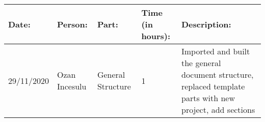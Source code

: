 \begin{table}[h]
    \begin{tabular}{|p{2cm}|p{2cm}|p{2cm}|p{1.5cm}|p{8cm}|}
        \hline
        Date:      & Person:       & Part:             & Time (in hours): & Description:                                       \\ \hline
        29/11/2020 & Ozan Incesulu & General Structure & 1             & Imported and built the general document structure, replaced template parts with new project, add sections\\ \hline
    \end{tabular}
\end{table}
